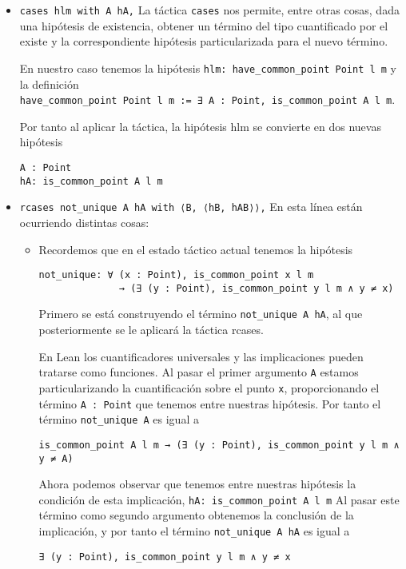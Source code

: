 \begin{itemize}
    \item \lstinline{cases hlm with A hA,} La táctica \lstinline{cases} nos
        permite, entre otras cosas, dada una hipótesis de existencia, obtener un
        término del tipo cuantificado por el existe y la correspondiente
        hipótesis particularizada para el nuevo término.
     
        En nuestro caso tenemos la hipótesis \lstinline{hlm: have_common_point Point l m}
        y la definición \\ \lstinline{have_common_point Point l m := ∃ A : Point, is_common_point A l m}.
    
        Por tanto al aplicar la táctica, la hipótesis hlm se convierte en dos nuevas hipótesis 
        \begin{lstlisting}
A : Point 
hA: is_common_point A l m
        \end{lstlisting}
        
    \item \lstinline{rcases not_unique A hA with ⟨B, ⟨hB, hAB⟩⟩,} En esta línea
        están ocurriendo distintas cosas:
        \begin{itemize}

            \item Recordemos que en el estado táctico actual tenemos la hipótesis 
                \begin{lstlisting}
not_unique: ∀ (x : Point), is_common_point x l m 
              → (∃ (y : Point), is_common_point y l m ∧ y ≠ x) 
                \end{lstlisting}

                Primero se está construyendo el término \lstinline{not_unique A hA}, 
                al que posteriormente se le aplicará la táctica {rcases}.

                En Lean los cuantificadores universales y las implicaciones
                pueden tratarse como funciones. Al pasar el primer argumento
                \lstinline{A} estamos particularizando la cuantificación sobre
                el punto \lstinline{x}, proporcionando el término 
                \lstinline{A : Point} que tenemos entre nuestras hipótesis. Por 
                tanto el término \lstinline{not_unique A} es igual a
                \begin{lstlisting}
is_common_point A l m → (∃ (y : Point), is_common_point y l m ∧ y ≠ A)
                \end{lstlisting}
                Ahora podemos observar que tenemos entre nuestras hipótesis la 
                condición de esta implicación, \lstinline{hA: is_common_point A l m}
                Al pasar este término como segundo argumento obtenemos la 
                conclusión de la implicación, y por tanto el término 
                \lstinline{not_unique A hA} es igual a 
                \begin{lstlisting}
∃ (y : Point), is_common_point y l m ∧ y ≠ x
                \end{lstlisting}


\end{itemize}
\end{itemize}
